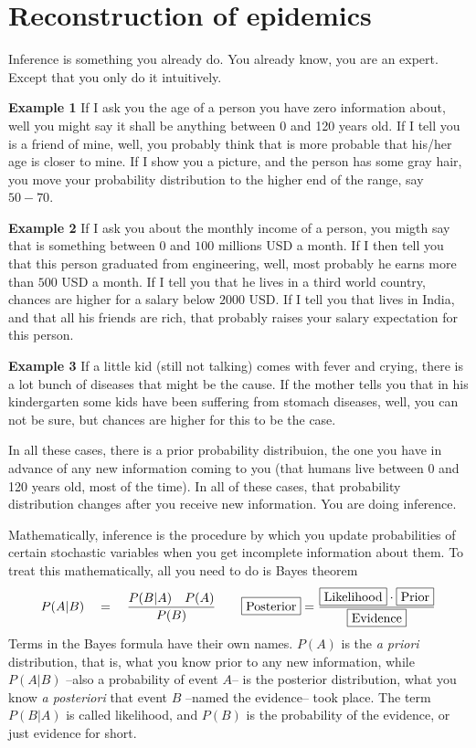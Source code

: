 
\chapter{Reconstruction of epidemics}

Inference is something you already do. You already know, you are an expert. Except that you only do it intuitively.

{\bf Example 1} If I ask you the age of a person you have zero information about, well you might say it shall be anything between 0 and 120 years old. If I tell you is a friend of mine, well, you probably think that is more probable that his/her age is closer to mine. If I show you a picture, and the person has some gray hair, you move your probability distribution to the higher end of the range, say $50-70$.

{\bf Example 2} If I ask you about the monthly income of a person, you migth say that is something between $0$ and $100$ millions USD a month. If I then tell you that this person graduated from engineering, well, most probably he earns more than $500$ USD a month. If I tell you that he lives in a third world country, chances are higher for a salary below $2000$ USD. If I tell you that lives in India, and that all his friends are rich, that probably raises your salary expectation for this person.

{\bf Example 3} If a little kid (still not talking) comes with fever and crying, there is a lot bunch of diseases that might be the cause. If the mother tells you that in his kindergarten
some kids have been suffering from stomach diseases, well, you can not be sure, but chances are higher for this to be the case.

In all these cases, there is a prior probability distribuion, the one you have in advance of any new information coming to you (that humans live between 0 and 120 years old, most of the time). In all of these cases, that probability distribution changes after you receive new information. You are doing inference.

Mathematically, inference is the procedure by which you update probabilities of certain stochastic variables when you get incomplete information about them. To treat this mathematically, all you need to do is Bayes theorem
\begin{equation}
 P(A|B)\quad = \quad \displaystyle \frac{P(B|A) \quad P(A)}{P(B)} \qquad
 \tikz[baseline=(posterior.base)]{\node[draw, rectangle] (posterior) {Posterior};} =  \frac{\tikz[baseline=(likelihood2.base)]{\node[draw, rectangle] (likelihood2) {Likelihood};} \cdot \tikz[baseline=(prior2.base)]{\node[draw, rectangle] (prior2) {Prior};}}{\tikz[baseline=(evidence.base)]{\node[draw, rectangle] (evidence) {Evidence};}}
\end{equation}
Terms in the Bayes formula have their own names. $P(A)$ is the {\it a priori} distribution, that is, what you know prior to any new information, while $P(A|B)$ --also a probability of event $A$-- is the posterior distribution, what you know {\it a posteriori } that event $B$ --named the evidence-- took place. The term $P(B|A)$ is called likelihood, and $P(B)$ is the probability of the evidence, or just evidence for short.


